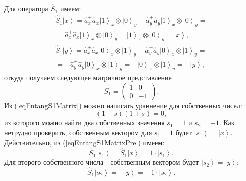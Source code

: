 Для оператора $\hat{S}_1$ имеем:
\begin{eqnarray}
\hat{S}_1 \left|x\right> = \hat{a}_x^{+} \hat{a}_x
\left|1\right>_x\otimes\left|0\right>_y - \hat{a}_y^{+}
\hat{a}_y\left|1\right>_x\otimes\left|0\right>_y =
\nonumber \\
= 
\hat{a}_x^{+} \hat{a}_x
\left|1\right>_x\otimes\left|0\right>_y =
\left|1\right>_x\otimes\left|0\right>_y = \left|x\right>,
\nonumber \\
\hat{S}_1 \left|y\right> = \hat{a}_x^{+} \hat{a}_x
\left|0\right>_x\otimes\left|1\right>_y - \hat{a}_y^{+}
\hat{a}_y\left|0\right>_x\otimes\left|1\right>_y =
\nonumber \\
=
-\hat{a}_y^{+}
\hat{a}_y\left|0\right>_x\otimes\left|1\right>_y
=-\left|0\right>_x\otimes\left|1\right>_y = -\left|y\right>,
\label{eqEntangS1MatrixPre}
\end{eqnarray}
откуда получаем следующее матричное представление
\begin{equation}
\hat{S}_1 = 
\left(
\begin{array}{cc}
1 & 0 \\
0 & -1 
\end{array}
\right).
\label{eqEntangS1Matrix}
\end{equation}
Из (\ref{eqEntangS1Matrix}) можно написать уравнение для собственных
чисел:
\[
\left(1-s\right)\left(1 + s\right) = 0,
\]
из которого можно найти два собственных значения $s_1 = 1$ и
$s_2 = -1$. Как нетрудно проверить, собственным вектором для $s_1 = 1$
будет $\left|s_1\right> = \left|x\right>$. Действительно, из (\ref{eqEntangS1MatrixPre})
имеем:
\begin{equation}
\hat{S}_1 \left|s_1\right> = \hat{S}_1 \left|x\right> = 1 \cdot \left|s_1\right>.
\label{eq:part2:pol:stocks_s1_1}
\end{equation}
Для второго собственного числа - собственным вектором будет
$\left|s_2\right> = \left|y\right>$:
\begin{equation}
\hat{S}_1 \left|s_2\right>  = - \left|y\right> = -1 \cdot \left|s_2\right>.
\label{eq:part2:pol:stocks_s1_2}
\end{equation}


